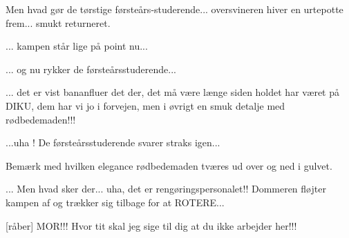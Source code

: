 \documentclass[a4paper,11pt]{article}
\begin{document}
\begin{sketch}
   Men hvad gør de tørstige
  førsteårs-studerende... oversvineren hiver en urtepotte
  frem... smukt returneret.


   ... kampen står lige på point nu...


   ... og nu rykker de førsteårsstuderende...


   ... det er vist bananfluer det der, det må være længe siden
  holdet har været på DIKU, dem har vi jo i forvejen, men i øvrigt en
  smuk detalje med rødbedemaden!!!


   ...uha !  De førsteårsstuderende svarer straks igen...


   Bemærk med hvilken elegance rødbedemaden tværes ud over og ned i gulvet.


   ... Men hvad sker der... uha, det er rengøringspersonalet!!
  Dommeren fløjter kampen af og trækker sig tilbage for at ROTERE...

  [råber] MOR!!! Hvor tit skal jeg sige til dig at du ikke
  arbejder her!!!

\end{sketch}
\end{document}
